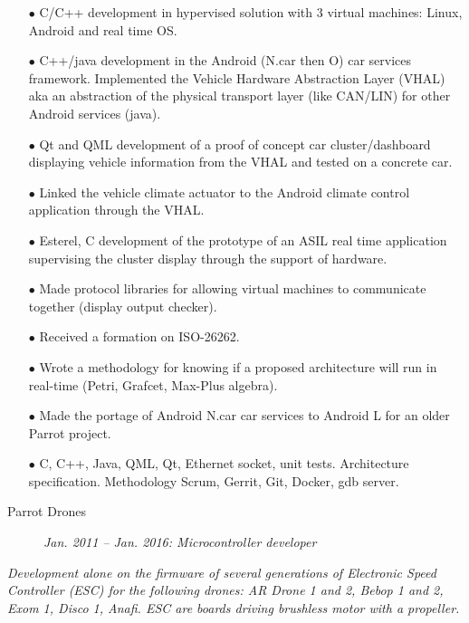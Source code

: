 \documentclass{crcv}
\newcommand{\desc}[4]{
\begin{description}
\item[\textcolor{fortitle}{#1}]\hspace*{\fill}\textit{\textcolor{fortitle}{#2 -- #3: #4}}\\
\end{description}
}
\begin{document}
\begin{itemize}
\item[$\bullet$] C/C++ development in hypervised solution with 3
  virtual machines: Linux, Android and real time OS.
\item[$\bullet$] C++/java development in the Android (N.car then O) car
  services framework. Implemented the Vehicle Hardware Abstraction Layer
  (VHAL) aka an abstraction of the physical transport layer (like
  CAN/LIN) for other Android services (java).
\item[$\bullet$] Qt and QML development of a proof of concept car
  cluster/dashboard displaying vehicle information from the VHAL
  and tested on a concrete car.
\item[$\bullet$] Linked the vehicle climate actuator to the Android
  climate control application through the VHAL.
\item[$\bullet$] Esterel, C development of the prototype of an ASIL
  real time application supervising the cluster display through the
  support of hardware.
\item[$\bullet$] Made protocol libraries for allowing virtual machines
  to communicate together (display output checker).
\item[$\bullet$] Received a formation on ISO-26262.
\item[$\bullet$] Wrote a methodology for knowing if a proposed
  architecture will run in real-time (Petri, Grafcet, Max-Plus
  algebra).
\item[$\bullet$] Made the portage of Android N.car car services to
  Android L for an older Parrot project.
\item[$\bullet$] C, C++, Java, QML, Qt, Ethernet socket, unit
  tests. Architecture specification. Methodology Scrum, Gerrit, Git,
  Docker, gdb server.
\end{itemize}

\desc{Parrot Drones}{Jan. 2011}{Jan. 2016}{Microcontroller developer}

\textit{Development alone on the firmware of several generations of
  Electronic Speed Controller (ESC) for the following drones: AR Drone
  1 and 2, Bebop 1 and 2, Exom 1, Disco 1, Anafi. ESC are boards
  driving brushless motor with a propeller.}
\end{document}
